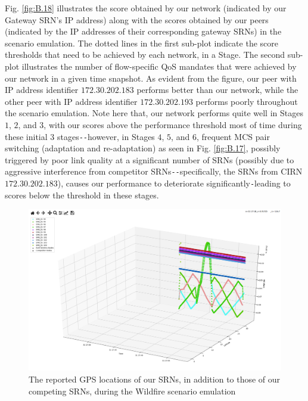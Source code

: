 Fig. \ref{fig:B.18} illustrates the score obtained by our network (indicated by our Gateway SRN's IP address) along with the scores obtained by our peers (indicated by the IP addresses of their corresponding gateway SRNs) in the scenario emulation. The dotted lines in the first sub-plot indicate the score thresholds that need to be achieved by each network, in a Stage. The second sub-plot illustrates the number of flow-specific QoS mandates that were achieved by our network in a given time snapshot. As evident from the figure, our peer with IP address identifier $172.30.202.183$ performs better than our network, while the other peer with IP address identifier $172.30.202.193$ performs poorly throughout the scenario emulation. Note here that, our network performs quite well in Stages $1$, $2$, and $3$, with our scores above the performance threshold most of time during these initial $3$ stages\texttt{-{}-}however, in Stages $4$, $5$, and $6$, frequent MCS pair switching (adaptation and re-adaptation) as seen in Fig. \ref{fig:B.17}, possibly triggered by poor link quality at a significant number of SRNs (possibly due to aggressive interference from competitor SRNs\texttt{-{}-}specifically, the SRNs from CIRN $172.30.202.183$), causes our performance to deteriorate significantly\texttt{-}leading to scores below the threshold in these stages.
\begin{figure} [htb]
    \centerline{
    \includegraphics[width = 1.0\textwidth]{Wildfire_GPS.PNG}}
    \caption{The reported GPS locations of our SRNs, in addition to those of our competing SRNs, during the Wildfire scenario emulation}
    \label{fig:B.19}
\end{figure}
